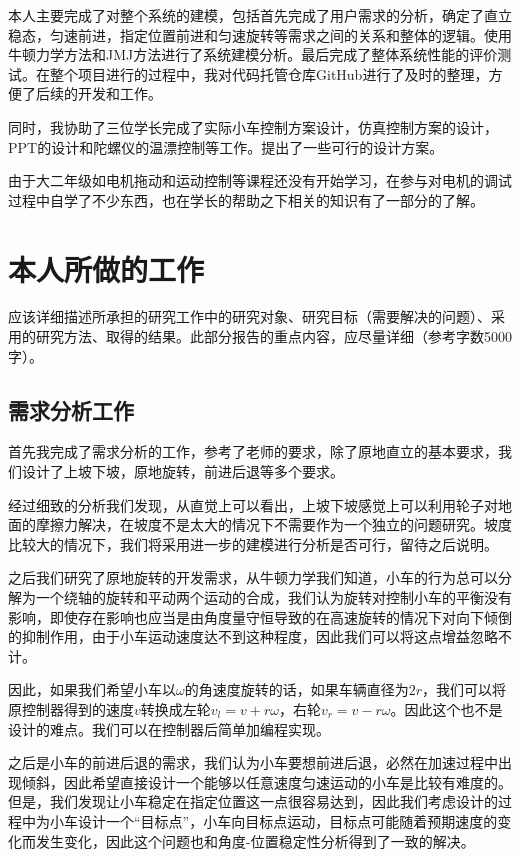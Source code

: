 \documentclass[UTF8,a4paper]{paper}
\begin{document}
本人主要完成了对整个系统的建模，包括首先完成了用户需求的分析，确定了直立稳态，匀速前进，指定位置前进和匀速旋转等需求之间的关系和整体的逻辑。使用牛顿力学方法和JMJ方法进行了系统建模分析。最后完成了整体系统性能的评价测试。在整个项目进行的过程中，我对代码托管仓库GitHub进行了及时的整理，方便了后续的开发和工作。

同时，我协助了三位学长完成了实际小车控制方案设计，仿真控制方案的设计，PPT的设计和陀螺仪的温漂控制等工作。提出了一些可行的设计方案。

由于大二年级如电机拖动和运动控制等课程还没有开始学习，在参与对电机的调试过程中自学了不少东西，也在学长的帮助之下相关的知识有了一部分的了解。

\clearpage\section{本人所做的工作}
应该详细描述所承担的研究工作中的研究对象、研究目标（需要解决的问题）、采用的研究方法、取得的结果。此部分报告的重点内容，应尽量详细（参考字数5000字）。

\subsection{需求分析工作}
首先我完成了需求分析的工作，参考了老师的要求，除了原地直立的基本要求，我们设计了上坡下坡，原地旋转，前进后退等多个要求。

经过细致的分析我们发现，从直觉上可以看出，上坡下坡感觉上可以利用轮子对地面的摩擦力解决，在坡度不是太大的情况下不需要作为一个独立的问题研究。坡度比较大的情况下，我们将采用进一步的建模进行分析是否可行，留待之后说明。

之后我们研究了原地旋转的开发需求，从牛顿力学我们知道，小车的行为总可以分解为一个绕轴的旋转和平动两个运动的合成，我们认为旋转对控制小车的平衡没有影响，即使存在影响也应当是由角度量守恒导致的在高速旋转的情况下对向下倾倒的抑制作用，由于小车运动速度达不到这种程度，因此我们可以将这点增益忽略不计。

因此，如果我们希望小车以$\omega$的角速度旋转的话，如果车辆直径为$2r$，我们可以将原控制器得到的速度$v$转换成左轮$v_l=v+r\omega$，右轮$v_r=v-r\omega$。因此这个也不是设计的难点。我们可以在控制器后简单加编程实现。

之后是小车的前进后退的需求，我们认为小车要想前进后退，必然在加速过程中出现倾斜，因此希望直接设计一个能够以任意速度匀速运动的小车是比较有难度的。但是，我们发现让小车稳定在指定位置这一点很容易达到，因此我们考虑设计的过程中为小车设计一个“目标点”，小车向目标点运动，目标点可能随着预期速度的变化而发生变化，因此这个问题也和角度-位置稳定性分析得到了一致的解决。
\end{document}
